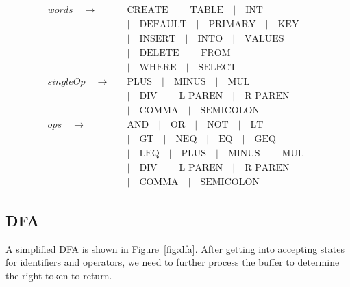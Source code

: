 \documentclass{article}
\begin{document}
\begin{align*}
words \quad\to\quad & \text{CREATE} \quad | \quad \text{TABLE}  \quad | \quad \text{INT} \\
&| \quad \text{DEFAULT} \quad | \quad \text{PRIMARY} \quad | \quad \text{KEY} \quad \\
&| \quad \text{INSERT} \quad | \quad \text{INTO} \quad | \quad \text{VALUES} \quad \\
&| \quad \text{DELETE} \quad | \quad \text{FROM} \quad \\
&| \quad \text{WHERE} \quad | \quad \text{SELECT} \\
singleOp \quad\to\quad &
\text{PLUS} \quad | \quad \text{MINUS} \quad | \quad \text{MUL} \\
&| \quad \text{DIV} \quad | \quad \text{L\_PAREN} \quad | \quad \text{R\_PAREN} \\
&| \quad \text{COMMA} \quad | \quad \text{SEMICOLON} \\
ops \quad\to\quad &
\text{AND} \quad | \quad \text{OR} \quad | \quad \text{NOT} \quad | \quad \text{LT} \\
&| \quad \text{GT} \quad | \quad \text{NEQ} \quad | \quad \text{EQ} \quad | \quad \text{GEQ} \\
&| \quad \text{LEQ} \quad | \quad \text{PLUS} \quad | \quad \text{MINUS} \quad | \quad \text{MUL} \\
&| \quad \text{DIV} \quad | \quad \text{L\_PAREN} \quad | \quad \text{R\_PAREN} \\
&| \quad \text{COMMA} \quad | \quad \text{SEMICOLON}
\end{align*}
\subsection{DFA}

A simplified DFA is shown in Figure~\ref{fig:dfa}. After getting into accepting states for identifiers and operators, we need to further process the buffer to determine the right token to return.
\end{document}
